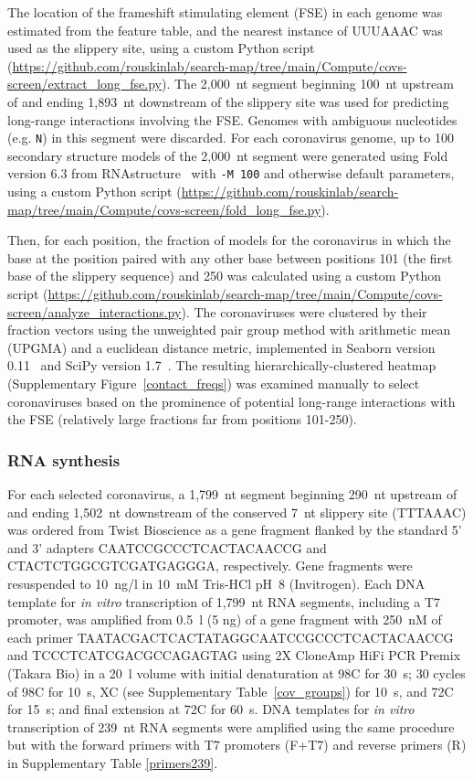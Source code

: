 \documentclass[main.tex]{subfiles}
\begin{document}
The location of the frameshift stimulating element (FSE) in each genome was estimated from the feature table, and the nearest instance of UUUAAAC was used as the slippery site, using a custom Python script (\url{https://github.com/rouskinlab/search-map/tree/main/Compute/covs-screen/extract_long_fse.py}).
The 2,000~nt segment beginning 100~nt upstream of and ending 1,893~nt downstream of the slippery site was used for predicting long-range interactions involving the FSE.
Genomes with ambiguous nucleotides (e.g. \verb|N|) in this segment were discarded.
For each coronavirus genome, up to 100 secondary structure models of the 2,000~nt segment were generated using Fold version 6.3 from RNAstructure~\cite{Reuter2010} with \verb|-M 100| and otherwise default parameters, using a custom Python script (\url{https://github.com/rouskinlab/search-map/tree/main/Compute/covs-screen/fold_long_fse.py}).

Then, for each position, the fraction of models for the coronavirus in which the base at the position paired with any other base between positions 101 (the first base of the slippery sequence) and 250 was calculated using a custom Python script (\url{https://github.com/rouskinlab/search-map/tree/main/Compute/covs-screen/analyze_interactions.py}).
The coronaviruses were clustered by their fraction vectors using the unweighted pair group method with arithmetic mean (UPGMA) and a euclidean distance metric, implemented in Seaborn version 0.11~\cite{Waskom2021} and SciPy version 1.7~\cite{Virtanen2020}.
The resulting hierarchically-clustered heatmap (Supplementary Figure~\ref{contact_freqs}) was examined manually to select coronaviruses based on the prominence of potential long-range interactions with the FSE (relatively large fractions far from positions 101-250).

\subsubsection{RNA synthesis}

For each selected coronavirus, a 1,799~nt segment beginning 290~nt upstream of and ending 1,502~nt downstream of the conserved 7~nt slippery site (TTTAAAC) was ordered from Twist Bioscience as a gene fragment flanked by the standard 5' and 3' adapters CAATCCGCCCTCACTACAACCG and CTACTCTGGCGTCGATGAGGGA, respectively.
Gene fragments were resuspended to 10~ng/\textmu l in 10~mM Tris-HCl pH~8 (Invitrogen).
Each DNA template for \textit{in vitro} transcription of 1,799~nt RNA segments, including a T7 promoter, was amplified from 0.5~\textmu l (5 ng) of a gene fragment with 250~nM of each primer TAATACGACTCACTATAGGCAATCCGCCCTCACTACAACCG and TCCCTCATCGACGCCAGAGTAG using 2X CloneAmp HiFi PCR Premix (Takara Bio) in a 20~\textmu l volume with initial denaturation at 98\textdegree C for 30~s; 30 cycles of 98\textdegree C for 10~s, X\textdegree C (see Supplementary Table~\ref{cov_groups}) for 10~s, and 72\textdegree C for 15~s; and final extension at 72\textdegree C for 60~s.
DNA templates for \textit{in vitro} transcription of 239~nt RNA segments were amplified using the same procedure but with the forward primers with T7 promoters (F+T7) and reverse primers (R) in Supplementary Table \ref{primers239}.
\end{document}
